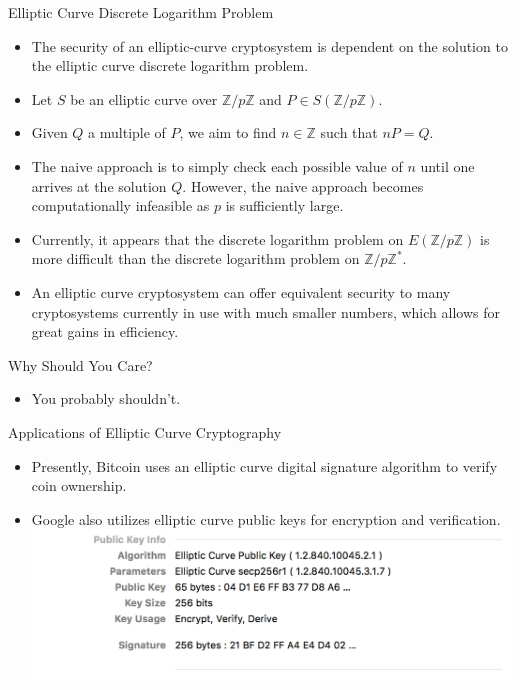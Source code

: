 \documentclass{beamer}
\begin{document}
	\begin{frame}{Elliptic Curve Discrete Logarithm Problem}
		\begin{itemize}
			\item The security of an elliptic-curve cryptosystem is dependent on the solution to the elliptic curve discrete logarithm problem.
			\item Let $S$ be an elliptic curve over $\mathbb{Z}/p\mathbb{Z}$ and $P \in S(\mathbb{Z}/p\mathbb{Z})$.
			\item Given $Q$ a multiple of $P$, we aim to find $n\in\mathbb{Z}$ such that $nP=Q$.
			\item The naive approach is to simply check each possible value of $n$ until one arrives at the solution $Q$. However, the naive approach becomes computationally infeasible as $p$ is sufficiently large.
			\item Currently, it appears that the discrete logarithm problem on $E(\mathbb{Z}/p\mathbb{Z})$ is more difficult than the discrete logarithm problem on $\mathbb{Z}/p\mathbb{Z}^*$.
			\item An elliptic curve cryptosystem can offer equivalent security to many cryptosystems currently in use with much smaller numbers, which allows for great gains in efficiency.
		\end{itemize}
	\end{frame}
	
	\begin{frame}{Why Should You Care?}
		\begin{itemize}
			\item You probably shouldn't.
		\end{itemize}
	\end{frame}
	
	\begin{frame}{Applications of Elliptic Curve Cryptography}
		\begin{itemize}
			\item Presently, Bitcoin uses an elliptic curve digital signature algorithm to verify coin ownership.
			\item Google also utilizes elliptic curve public keys for encryption and verification.
			\newline \includegraphics[scale=.5]{google.png}
		\end{itemize}
	\end{frame}
\end{document}
